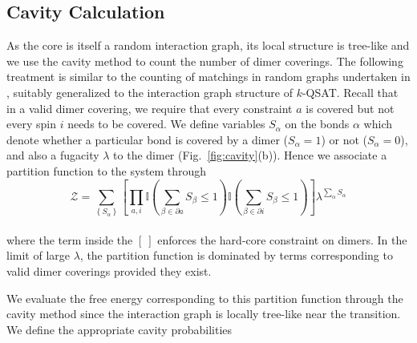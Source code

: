 \documentclass[aps,pra,twocolumn,superscriptaddress,amsmath]{revtex4-1}
\begin{document}
\subsection{Cavity Calculation} %
\label{sub:cavity_calculation}
As the core is itself a random interaction graph, its local structure is tree-like and we use the cavity method to count the number of dimer coverings. 
The following treatment is similar to the counting of matchings in random graphs undertaken in \cite{Zdeborova:2006aa}, suitably generalized to the interaction graph structure of $k$-QSAT.
Recall that in a valid dimer covering, we require that every constraint $a$ is covered but not every spin $i$
needs to be covered. 
We define variables $S_{\alpha}$ on the bonds $\alpha$  which denote whether a particular bond is covered by a dimer ($S_{\alpha}=1$) or not ($S_{\alpha}=0$),
and also a fugacity $\lambda$ to the dimer (Fig.~\ref{fig:cavity}(b)). 
Hence we associate a partition function to the system through
\begin{equation}
\mathcal{Z}=\sum_{\left\{ S_{\alpha}\right\} }\left[\prod_{a,i}\mathbb{I}\left(\sum_{\beta\in\partial a}S_{\beta}\leq1\right)\mathbb{I}\left(\sum_{\beta\in\partial i}S_{\beta}\leq1\right)\right]\lambda^{\sum_{\alpha}S_{\alpha}}
\end{equation}
\\
where the term inside the $\left[\ \right]$ enforces the hard-core constraint on dimers. 
In the limit of large $\lambda$, the partition function is dominated by terms corresponding to valid dimer
coverings provided they exist. 

We evaluate the free energy corresponding to this partition function through 
the cavity method since the interaction graph is locally tree-like near the transition. 
We define the appropriate cavity probabilities 
\end{document}
